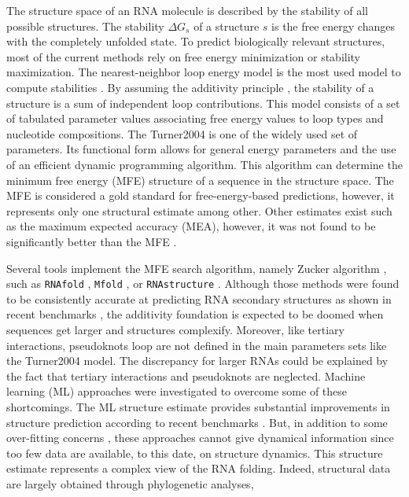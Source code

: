 \documentclass[a4paper,12pt]{article}
\begin{document}
The structure space of an RNA molecule is described by the stability of all
possible structures. The stability \(\Delta G_s\) of a structure \(s\) is the free
energy changes with the completely unfolded state. To predict biologically
relevant structures, most of the current methods rely on free energy
minimization or stability maximization. The nearest-neighbor loop energy model
is the most used model to compute stabilities \cite{turner09_nndb}. By assuming
the additivity principle \cite{dill97_addit_princ_bioch}, the stability of a
structure is a sum of independent loop contributions. This model consists of a
set of tabulated parameter values associating free energy values to loop types
and nucleotide compositions. The Turner2004
\cite{mathews04_incor_chemic_modif_const_into} is one of the widely used set of
parameters. Its functional form allows for general energy parameters and the use
of an efficient dynamic programming algorithm. This algorithm can determine the
minimum free energy (MFE) structure of a sequence in the structure space. The
MFE is considered a gold standard for free-energy-based predictions, however, it
represents only one structural estimate among other. Other estimates exist such
as the maximum expected accuracy (MEA), however, it was not found to be
significantly better than the MFE \cite{mathews19_how_to_bench_rna_secon}.

Several tools implement the MFE search algorithm, namely Zucker algorithm
\cite{zuker81_optim_comput_foldin_large_rna}, such as \texttt{RNAfold}
\cite{hofacker03_vienn_rna_secon_struc_server}, \texttt{Mfold}
\cite{zuker03_mfold_web_server_nucleic_acid}, or \texttt{RNAstructure}
\cite{reuter10_rnast}. Although those methods were found to be consistently
accurate at predicting RNA secondary structures as shown in recent benchmarks
\cite{sato20_rna,huang19_linear}, the additivity foundation is expected to be
doomed when sequences get larger and structures complexify. Moreover, like
tertiary interactions, pseudoknots loop are not defined in the main parameters
sets like the Turner2004 model. The discrepancy for larger RNAs could be
explained by the fact that tertiary interactions and pseudoknots are neglected.
Machine learning (ML) approaches were investigated to overcome some of these
shortcomings. The ML structure estimate provides substantial improvements in
structure prediction according to recent benchmarks
\cite{singh19_rna_secon_struc_predic_using,sato20_rna}. But, in addition to some
over-fitting concerns \cite{rivas11_range_compl_probab_model_rna}, these
approaches cannot give dynamical information since too few data are available,
to this date, on structure dynamics. This structure estimate represents a
complex view of the RNA folding. Indeed, structural data are largely obtained
through phylogenetic analyses,
\end{document}
